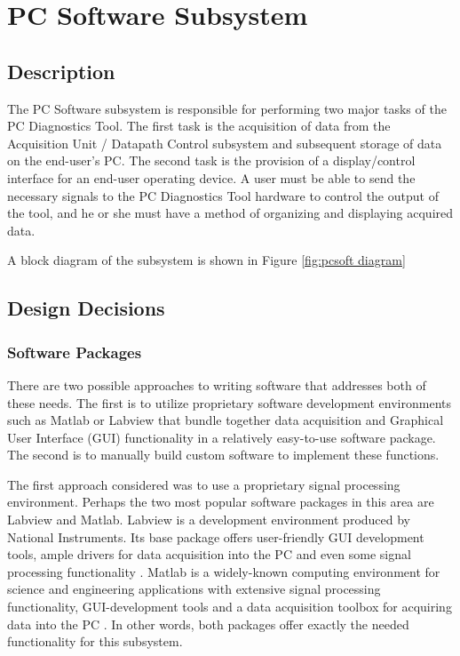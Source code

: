 \section[PC Software]{PC Software Subsystem}
\subsection{Description}
	The PC Software subsystem is responsible for performing two major tasks of 
the PC Diagnostics Tool. The first task is the acquisition of data from the 
Acquisition Unit / Datapath Control subsystem and subsequent storage of data on 
the end-user's PC. The second task is the provision of a display/control 
interface for an end-user operating device. A user must be able to send the 
necessary signals to the PC Diagnostics Tool hardware to control the output of 
the tool, and he or she must have a method of organizing and displaying 
acquired data.

A block diagram of the subsystem is shown in Figure \ref{fig:pcsoft diagram}


\subsection[Design Decisions]{Design Decisions}
\subsubsection[Software Packages]{Software Packages}
There are two possible approaches to writing software that addresses both of 
these needs. The first is to utilize proprietary software development 
environments such as Matlab or Labview that bundle together data acquisition 
and Graphical User Interface (GUI) functionality in a relatively easy-to-use 
software package. The second is to manually build custom software to implement 
these functions.

The first approach considered was to use a proprietary signal processing 
environment. Perhaps the two most popular software packages in this area are 
Labview and Matlab. Labview is a development environment produced by National 
Instruments. Its base package offers user-friendly GUI development tools, ample 
drivers for data acquisition into the PC and even some signal processing 
functionality \cite{web:labviewbase}. Matlab is a widely-known computing 
environment for science and engineering applications with extensive signal 
processing functionality, GUI-development tools and a data acquisition toolbox 
for acquiring data into the PC \cite{web:matlab}. In other words, both packages 
offer exactly the needed functionality for this subsystem.

